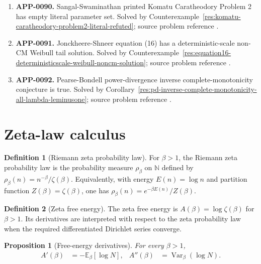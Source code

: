 \documentclass[11pt]{article}
\numberwithin{equation}{section}
\newtheorem{proposition}[theorem]{Proposition}
\theoremstyle{definition}
\newtheorem{definition}{Definition}[section]
\theoremstyle{remark}
\DeclareMathOperator{\Var}{Var}
\newcommand{\E}{\mathbb E}
\newcommand{\1}{\mathbf 1}
\begin{document}
\begin{enumerate}
\item \label{ledger:app-0090}\textbf{APP-0090.} Sangal-Swaminathan printed Komatu Caratheodory Problem 2 has empty literal parameter set. Solved by Counterexample~\ref{res:komatu-caratheodory-problem2-literal-refuted}; source problem reference \cite{app-app-0090-source}.
\item \label{ledger:app-0091}\textbf{APP-0091.} Jonckheere-Shneer equation (16) has a deterministic-scale non-CM Weibull tail solution. Solved by Counterexample~\ref{res:equation16-deterministicscale-weibull-noncm-solution}; source problem reference \cite{app-app-0091-source}.
\item \label{ledger:app-0092}\textbf{APP-0092.} Pearse-Bondell power-divergence inverse complete-monotonicity conjecture is true. Solved by Corollary~\ref{res:pd-inverse-complete-monotonicity-all-lambda-leminusone}; source problem reference \cite{app-app-0092-source}.
\end{enumerate}

\section{Zeta-law calculus}

\begin{definition}[Riemann zeta probability law]
\label{def:zeta-law}
For \(\beta>1\), the Riemann zeta probability law is the probability measure \(\rho_\beta\) on \(\mathbb N\) defined by \(\rho_\beta(n)=n^{-\beta}/\zeta(\beta)\). Equivalently, with energy \(E(n)=\log n\) and partition function \(Z(\beta)=\zeta(\beta)\), one has \(\rho_\beta(n)=e^{-\beta E(n)}/Z(\beta)\).
\end{definition}

\begin{definition}[Zeta free energy]
\label{def:zeta-free-energy}
The zeta free energy is \(A(\beta)=\log\zeta(\beta)\) for \(\beta>1\). Its derivatives are interpreted with respect to the zeta probability law when the required differentiated Dirichlet series converge.
\end{definition}

\begin{proposition}[Free-energy derivatives]
\label{prop:free-energy-derivatives}
For every \(\beta>1\),
\begin{align}
\label{eq:free-energy-derivatives}
A'(\beta)&=-\E_\beta[\log N],&
A''(\beta)&=\Var_\beta(\log N).
\end{align}
\end{proposition}
\end{document}
